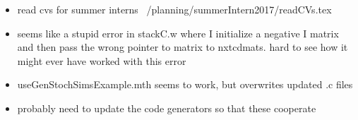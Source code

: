 \documentclass[hyperref]{labbook}
\begin{document}
 \begin{itemize}
 \item read cvs for summer interns  ~/planning/summerIntern2017/readCVs.tex
 \end{itemize}











\begin{itemize}
\item seems like a stupid error in stackC.w where I initialize a negative I matrix and then pass the wrong pointer to matrix to nxtcdmats.  hard to see how it might ever have worked with this error
\item useGenStochSimsExample.mth seems to work, but overwrites updated .c files
\item probably need to update the code generators so that these cooperate
\end{itemize}








\end{document}
